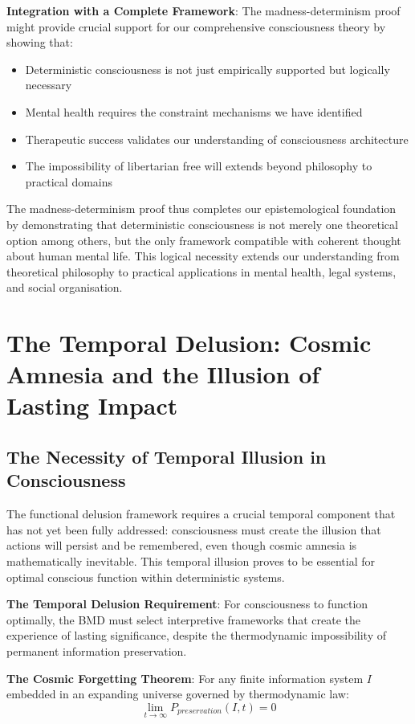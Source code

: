 \documentclass[12pt]{article}
\begin{document}
\textbf{Integration with a Complete Framework}: The madness-determinism proof might provide crucial support for our comprehensive consciousness theory by showing that:
\begin{itemize}
\item Deterministic consciousness is not just empirically supported but logically necessary
\item Mental health requires the constraint mechanisms we have identified
\item Therapeutic success validates our understanding of consciousness architecture
\item The impossibility of libertarian free will extends beyond philosophy to practical domains
\end{itemize}

The madness-determinism proof thus completes our epistemological foundation by demonstrating that deterministic consciousness is not merely one theoretical option among others, but the only framework compatible with coherent thought about human mental life. This logical necessity extends our understanding from theoretical philosophy to practical applications in mental health, legal systems, and social organisation.

\section{The Temporal Delusion: Cosmic Amnesia and the Illusion of Lasting Impact}

\subsection{The Necessity of Temporal Illusion in Consciousness}

The functional delusion framework requires a crucial temporal component that has not yet been fully addressed: consciousness must create the illusion that actions will persist and be remembered, even though cosmic amnesia is mathematically inevitable. This temporal illusion proves to be essential for optimal conscious function within deterministic systems.

\textbf{The Temporal Delusion Requirement}: For consciousness to function optimally, the BMD must select interpretive frameworks that create the experience of lasting significance, despite the thermodynamic impossibility of permanent information preservation.

\textbf{The Cosmic Forgetting Theorem}: For any finite information system $I$ embedded in an expanding universe governed by thermodynamic law:
$$\lim_{t \to \infty} P_{preservation}(I,t) = 0$$
\end{document}
